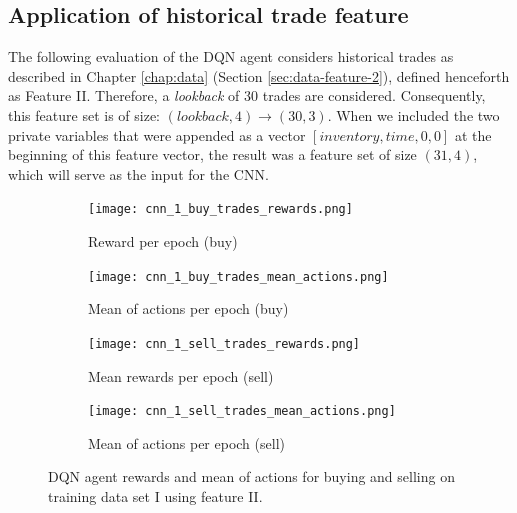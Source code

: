 \subsection{Application of historical trade feature}

The following evaluation of the DQN agent considers historical trades as described in Chapter \ref{chap:data} (Section \ref{sec:data-feature-2}),  defined henceforth as Feature II.
Therefore, a \textit{lookback} of 30 trades are considered.
Consequently, this feature set is of size: $(lookback, 4) \rightarrow (30, 3)$.
When we included the two private variables that were appended as a vector $[inventory, time, 0, 0]$ at the beginning of this feature vector, the result was a feature set of size $(31, 4)$, which will serve as the input for the CNN.

\begin{figure}[H]
    \centering
    \begin{subfigure}[b]{0.45\textwidth}
        \texttt{[image: cnn\_1\_buy\_trades\_rewards.png]}
        \caption{Reward per epoch (buy)}
        \label{fig:analysis-dqn-1-trades-reward-buy}
    \end{subfigure}
    \begin{subfigure}[b]{0.45\textwidth}
        \texttt{[image: cnn\_1\_buy\_trades\_mean\_actions.png]}
        \caption{Mean of actions per epoch (buy)}
        \label{fig:analysis-dqn-1-trades-action-buy}
    \end{subfigure}
    \begin{subfigure}[b]{0.45\textwidth}
        \texttt{[image: cnn\_1\_sell\_trades\_rewards.png]}
        \caption{Mean rewards per epoch (sell)}
        \label{fig:analysis-dqn-1-trades-reward-sell}
    \end{subfigure}
    \begin{subfigure}[b]{0.45\textwidth}
        \texttt{[image: cnn\_1\_sell\_trades\_mean\_actions.png]}
        \caption{Mean of actions per epoch (sell)}
        \label{fig:analysis-dqn-1-trades-action-sell}
    \end{subfigure}
    \caption{DQN agent rewards and mean of actions for buying and selling on training data set I using feature II.}
    \label{fig:analysis-dqn-1-trades}
\end{figure}

